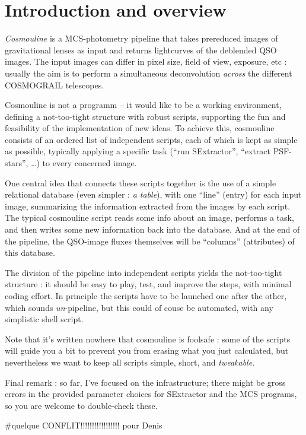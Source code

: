 
\section{Introduction and overview}

\emph{Cosmouline} is a MCS-photometry pipeline that takes prereduced images of gravitational lenses as input and returns lightcurves of the deblended QSO images. The input images can differ in pixel size, field of view, exposure, etc : usually the aim is to perform a simultaneous deconvolution \emph{across} the different COSMOGRAIL telescopes.

Cosmouline is not a programm -- it would like to be a working environment, defining a not-too-tight structure with robust scripts, supporting the fun and feasibility of the implementation of new ideas. To achieve this, cosmouline consists of an ordered list of independent scripts, each of which is kept as simple as possible, typically applying a specific task (``run SExtractor'', ``extract PSF-stars'', \ldots) to every concerned image.

One central idea that connects these scripts together is the use of a simple relational database (even simpler : \emph{a table}), with one ``line'' (entry) for each input image, summarizing the information extracted from the images by each script. The typical cosmouline script reads some info about an image, performs a task, and then writes some new information back into the database. And at the end of the pipeline, the QSO-image fluxes themselves will be ``columns'' (attributes) of  this database.


The division of the pipeline into independent scripts yields the not-too-tight structure : it should be easy to play, test, and improve the steps, with minimal coding effort. In principle the scripts have to be launched one after the other, which sounds \emph{un}-pipeline, but this could of couse be automated, with any simplistic shell script.

Note that it's written nowhere that cosmouline is foolsafe : some of the scripts will guide you a bit to prevent you from erasing what you just calculated, but nevertheless we want to keep all scripts simple, short, and \emph{tweakable}\texttrademark.

Final remark : so far, I've focused on the infrastructure; there might be gross errors in the provided parameter choices for SExtractor and the MCS programs, so you are welcome to double-check these.

#quelque CONFLIT!!!!!!!!!!!!!!!!! pour Denis


